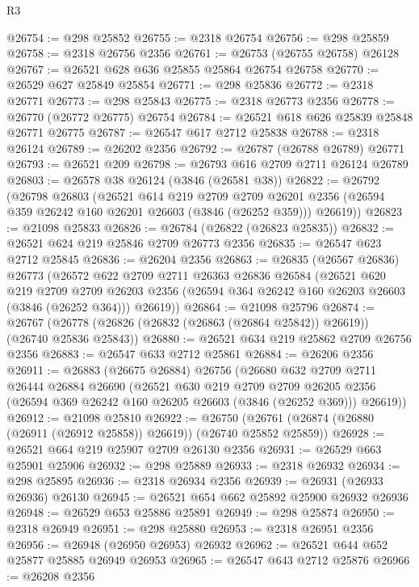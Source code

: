 \begin{lexlean}{R3}
\begin{coremodule}
@26754 := @298 @25852
@26755 := @2318 @26754
@26756 := @298 @25859
@26758 := @2318 @26756 @2356
@26761 := @26753 (@26755 @26758) @26128
@26767 := @26521 @628 @636 @25855 @25864 @26754 @26758
@26770 := @26529 @627 @25849 @25854
@26771 := @298 @25836
@26772 := @2318 @26771
@26773 := @298 @25843
@26775 := @2318 @26773 @2356
@26778 := @26770 (@26772 @26775) @26754
@26784 := @26521 @618 @626 @25839 @25848 @26771 @26775
@26787 := @26547 @617 @2712 @25838
@26788 := @2318 @26124
@26789 := @26202 @2356
@26792 := @26787 (@26788 @26789) @26771
@26793 := @26521 @209
@26798 := @26793 @616 @2709 @2711 @26124 @26789
@26803 := @26578 @38 @26124 (@3846 (@26581 @38))
@26822 := @26792
    (@26798
      @26803
      (@26521
        @614
        @219
        @2709
        @2709
        @26201
        @2356
        (@26594 @359 @26242 @160 @26201 @26603 (@3846 (@26252 @359)))
        @26619))
@26823 := @21098 @25833
@26826 := @26784 (@26822 (@26823 @25835))
@26832 := @26521 @624 @219 @25846 @2709 @26773 @2356
@26835 := @26547 @623 @2712 @25845
@26836 := @26204 @2356
@26863 := @26835
    (@26567 @26836)
    @26773
    (@26572
      @622
      @2709
      @2711
      @26363
      @26836
      @26584
      (@26521
        @620
        @219
        @2709
        @2709
        @26203
        @2356
        (@26594 @364 @26242 @160 @26203 @26603 (@3846 (@26252 @364)))
        @26619))
@26864 := @21098 @25796
@26874 := @26767 (@26778 (@26826 (@26832 (@26863 (@26864 @25842)) @26619)) (@26740 @25836 @25843))
@26880 := @26521 @634 @219 @25862 @2709 @26756 @2356
@26883 := @26547 @633 @2712 @25861
@26884 := @26206 @2356
@26911 := @26883
    (@26675 @26884)
    @26756
    (@26680
      @632
      @2709
      @2711
      @26444
      @26884
      @26690
      (@26521
        @630
        @219
        @2709
        @2709
        @26205
        @2356
        (@26594 @369 @26242 @160 @26205 @26603 (@3846 (@26252 @369)))
        @26619))
@26912 := @21098 @25810
@26922 := @26750 (@26761 (@26874 (@26880 (@26911 (@26912 @25858)) @26619)) (@26740 @25852 @25859))
@26928 := @26521 @664 @219 @25907 @2709 @26130 @2356
@26931 := @26529 @663 @25901 @25906
@26932 := @298 @25889
@26933 := @2318 @26932
@26934 := @298 @25895
@26936 := @2318 @26934 @2356
@26939 := @26931 (@26933 @26936) @26130
@26945 := @26521 @654 @662 @25892 @25900 @26932 @26936
@26948 := @26529 @653 @25886 @25891
@26949 := @298 @25874
@26950 := @2318 @26949
@26951 := @298 @25880
@26953 := @2318 @26951 @2356
@26956 := @26948 (@26950 @26953) @26932
@26962 := @26521 @644 @652 @25877 @25885 @26949 @26953
@26965 := @26547 @643 @2712 @25876
@26966 := @26208 @2356

\end{coremodule}
\end{lexlean}
